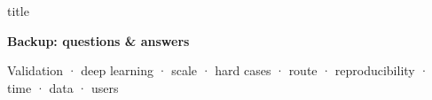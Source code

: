 
\begin{frame}[c]
  \centering
  \begin{beamercolorbox}[sep=5mm, center, rounded=true, shadow=true]{title}
    {\LARGE\bfseries Backup: questions \& answers\par}
  \end{beamercolorbox}
  \vspace{4mm}
  {\footnotesize\color{sxMuted} Validation · deep learning · scale · hard cases · route · reproducibility · time · data · users\par}
\end{frame}

